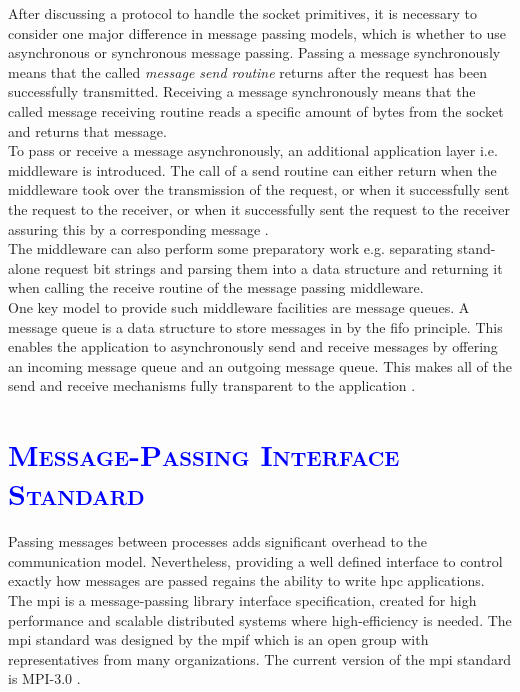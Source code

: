 \documentclass[xcolor=dvipsnames]{article}
\begin{document}
\noindent After discussing a protocol to handle the socket primitives, it is necessary to consider one major difference in message passing models, which is whether to use asynchronous or synchronous message passing. Passing a message synchronously means that the called \textit{message send routine} returns after the request has been successfully transmitted. Receiving a message synchronously means that the called message receiving routine reads a specific amount of bytes from the socket and returns that message.\\

\noindent To pass or receive a message asynchronously, an additional application layer i.e. middleware is introduced. The call of a send routine can either return when the middleware took over the transmission of the request, or when it successfully sent the request to the receiver, or when it successfully sent the request to the receiver assuring this by a corresponding message \cite[ch. 4.1 on p. 125]{tanenbaum}.\\

\noindent The middleware can also perform some preparatory work e.g. separating stand-alone request bit strings and parsing them into a data structure and returning it when calling the receive routine of the message passing middleware.\\

\noindent One key model to provide such middleware facilities are message queues. A message queue is a data structure to store messages in by the \gls{fifo} principle. This enables the application to asynchronously send and receive messages by offering an incoming message queue and an outgoing message queue. This makes all of the send and receive mechanisms fully transparent to the application \cite[ch. 4.3.2 on p. 145 - 147]{tanenbaum}.

\section{\scshape{\textcolor{blue}{Message-Passing Interface Standard}}} \label{message_passing_interface}

Passing messages between processes adds significant overhead to the communication model. Nevertheless, providing a well defined interface to control exactly how messages are passed regains the ability to write \gls{hpc} applications.\\

\noindent The \gls{mpi} is a message-passing library interface specification, created for high performance and scalable distributed systems where high-efficiency is needed.  The \gls{mpi} standard was designed by the \sloppy \gls{mpif} which is an open group with representatives from many organizations. The current version of the \gls{mpi} standard is MPI-3.0 \cite[ch. Abstract/ii \& ch. Acknowledgements/xx \& ch. 1.1 on p. 1 \& ch. 1.2 on p. 2]{mpi}.\\
\end{document}
